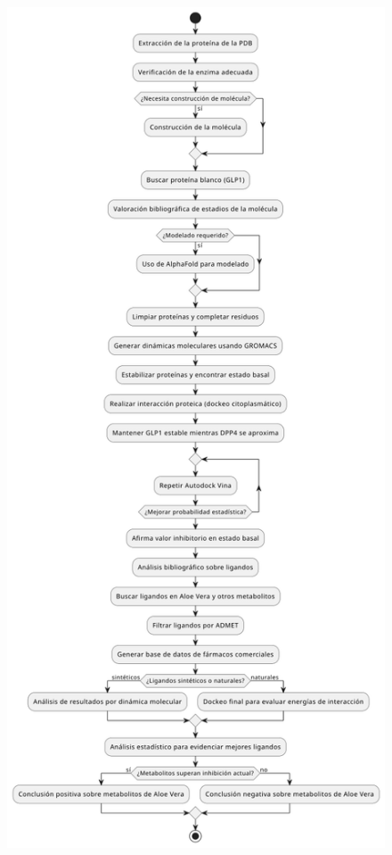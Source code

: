 \begin{figure}[h]
    \centering
    \includegraphics[scale=0.485]{figuras/Flujograma.png}
\end{figure}







